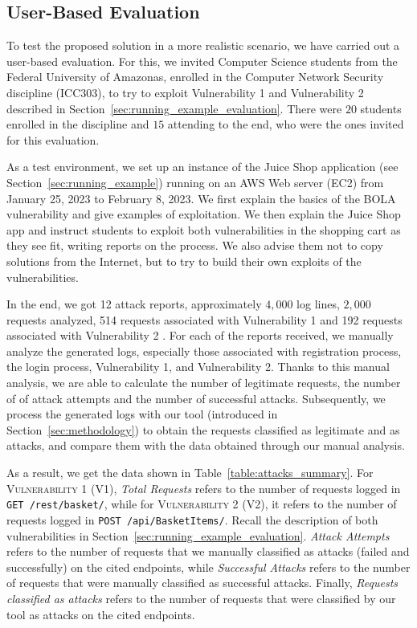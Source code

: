 \subsection{User-Based Evaluation}
\label{sec:ruser_based_evaluation}

To test the proposed solution in a more realistic scenario, we have carried out a user-based evaluation. 
For this, we invited Computer Science students from the Federal University of Amazonas, enrolled in the Computer Network Security discipline (ICC303), to try to exploit
{\sc Vulnerability 1} and {\sc Vulnerability 2} described in Section~\ref{sec:running_example_evaluation}.
There were $20$ students enrolled in the discipline and $15$ attending to the end, who were the ones invited for this evaluation.

As a test environment, we set up an instance of the Juice Shop application (see Section~\ref{sec:running_example})  running on an AWS Web server (EC2) from January 25, 2023 to February 8, 2023. We first explain the basics of the BOLA vulnerability and give examples of exploitation. We then explain the Juice Shop app and instruct students to exploit both vulnerabilities in the shopping cart as they see fit, writing reports on the process. We also advise them not to copy solutions from the Internet, but to try to build their own exploits of the vulnerabilities.

In the end, we got 12 attack reports, approximately $4,000$ log lines, $2,000$ requests analyzed, 514 requests associated with {\sc Vulnerability 1} %
and 192 requests associated with {\sc Vulnerability 2}%
. For each of the reports received, we manually analyze the generated logs, especially those associated with registration process, the login process, {\sc Vulnerability 1}, and {\sc Vulnerability 2}. Thanks to this manual analysis, we are able to calculate the number of legitimate requests, the number of of attack attempts and the number of successful attacks.  
%
Subsequently, we process the generated logs with our tool (introduced in Section~\ref{sec:methodology}) to obtain the requests classified as legitimate and as attacks, and compare them with the data obtained through our manual analysis. 

As a result, we get the data shown in Table~\ref{table:attacks_summary}. For \textsc{Vulnerability 1} ({\sc V1}), \textit{Total Requests} refers to the number of requests logged in \texttt{GET /rest/basket/}, while for \textsc{Vulnerability 2} ({\sc V2}), it refers to the number of requests logged in \texttt{POST /api/BasketItems/}. Recall the description of both vulnerabilities in Section~\ref{sec:running_example_evaluation}. \textit{Attack Attempts} refers to the number of requests that we manually classified as attacks (failed and successfully) on the cited endpoints, while \textit{Successful Attacks} refers to the number of requests that were manually classified as successful attacks. Finally, \textit{Requests classified as attacks} refers to the number of requests that were classified by our tool as attacks on the cited endpoints.


